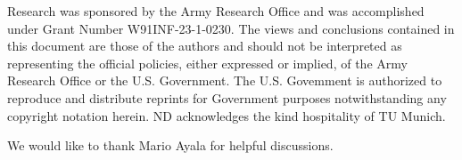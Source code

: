 \documentclass[UTF-8,reqno]{amsart}
\numberwithin{equation}{section}
\begin{document}
\quad Research was sponsored by the Army Research Office and was accomplished under Grant Number W91INF-23-1-0230. The views and conclusions contained in this document are those of the authors and should not be interpreted as representing the official policies, either expressed or implied, of the Army Research Office or the U.S. Government. The U.S. Govemment is authorized to reproduce and distribute reprints for Government purposes notwithstanding any copyright notation herein. ND acknowledges the kind hospitality of TU Munich. 

We would like to thank Mario Ayala for helpful discussions. 













\end{document}
